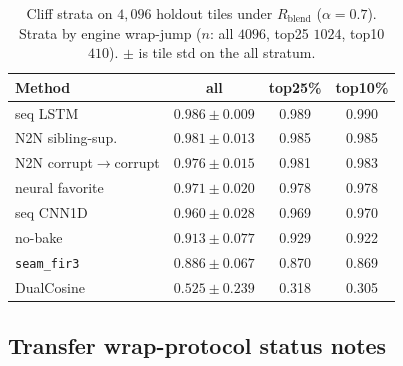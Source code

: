 \begin{table}[htbp]
  \centering
  \caption{Cliff strata on $4{,}096$ holdout tiles under $R_{\mathrm{blend}}$ ($\alpha{=}0.7$).
  Strata by engine wrap-jump ($n$: all $4096$, top25 $1024$, top10 $410$).
  $\pm$ is tile std on the all stratum.}
  \label{tab:cliff-strata}
  \setlength{\tabcolsep}{3pt}
  \footnotesize
  \begin{tabular}{@{}lccc@{}}
    \toprule
    Method & all & top25\% & top10\% \\
    \midrule
    seq LSTM & $0.986\pm0.009$ & 0.989 & 0.990 \\
    N2N sibling-sup. & $0.981\pm0.013$ & 0.985 & 0.985 \\
    N2N corrupt$\to$corrupt & $0.976\pm0.015$ & 0.981 & 0.983 \\
    neural favorite & $0.971\pm0.020$ & 0.978 & 0.978 \\
    seq CNN1D & $0.960\pm0.028$ & 0.969 & 0.970 \\
    no-bake & $0.913\pm0.077$ & 0.929 & 0.922 \\
    \texttt{seam\_fir3} & $0.886\pm0.067$ & 0.870 & 0.869 \\
    DualCosine & $0.525\pm0.239$ & 0.318 & 0.305 \\
    \bottomrule
  \end{tabular}
\end{table}
\FloatBarrier






\subsection{Transfer wrap-protocol status notes}
\label{sec:app-transfer-status}

